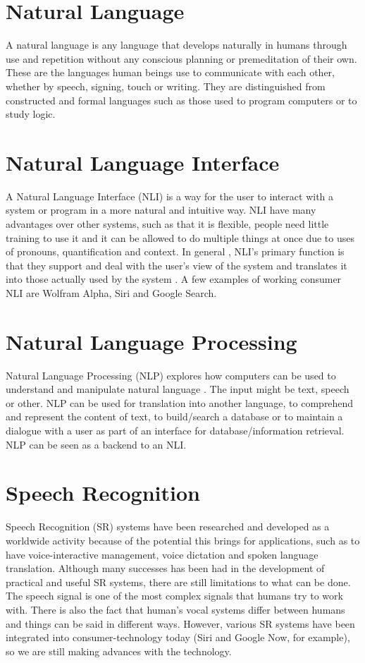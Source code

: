 \section{Natural Language}
A natural language is any language that develops naturally in humans through use and repetition without any conscious planning or premeditation of their own. These are the languages human beings use to communicate with each other, whether by speech, signing, touch or writing. They are distinguished from constructed and formal languages such as those used to program computers or to study logic.
 
\section{Natural Language Interface}
A Natural Language Interface (NLI) is a way for the user to interact with a system or program in a more natural and intuitive way. NLI have many advantages over other systems, such as that it is flexible, people need little training to use it and it can be allowed to do multiple things at once due to uses of pronouns, quantification and context. In general , NLI’s primary function is that they support and deal with the user’s view of the system and translates it into those actually used by the system \citep{Hend}. A few examples of working consumer NLI are Wolfram Alpha, Siri and Google Search.

\section{Natural Language Processing}
Natural Language Processing (NLP) explores how computers can be used to understand and manipulate natural language \citep{Gobi}. The input might be text, speech or other. NLP can be used for translation into another language, to comprehend and represent the content of text, to build/search a database or to maintain a dialogue with a user as part of an interface for database/information retrieval. \citep{Allen} NLP can be seen as a backend to an NLI.

\section{Speech Recognition}
Speech Recognition (SR) systems have been researched and developed as a worldwide activity because of the potential this brings for applications, such as to have voice-interactive management, voice dictation and spoken language translation. Although many successes has been had in the development of practical and useful SR systems, there are still limitations to what can be done. The speech signal is one of the most complex signals that humans try to work with. There is also the fact that human’s vocal systems differ between humans and things can be said in different ways. However, various SR systems have been integrated into consumer-technology today (Siri and Google Now, for example), so we are still making advances with the technology. \citep{SR}


